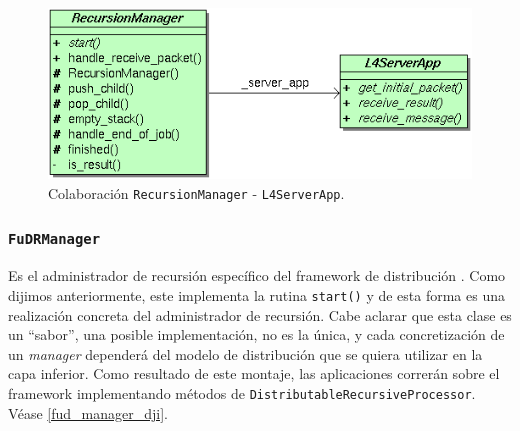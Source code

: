 \begin{figure}[ht] \hspace{1.5cm}
    \includegraphics[scale=.6]{images/rec_manager_with_l4_server_app.png}
    \caption{Colaboración \texttt{RecursionManager} - \texttt{L4ServerApp}.}
    \label{rec_manager_with_l4_server_app}
\end{figure}


\subsubsection{\texttt{FuDRManager}}

Es el administrador de recursión específico del framework de distribución \fud. Como dijimos anteriormente, este implementa la rutina
\texttt{start()} y de esta forma es una realización concreta del administrador de recursión. Cabe aclarar que esta clase es un ``sabor'',
una posible implementación, no es la única, y cada concretización de un \textit{manager} dependerá del modelo de distribución que se quiera
utilizar en la capa inferior. Como resultado de este montaje, las aplicaciones correrán sobre el framework \fud{} implementando métodos de
\texttt{DistributableRecursiveProcessor}. Véase \ref{fud_manager_dji}.

